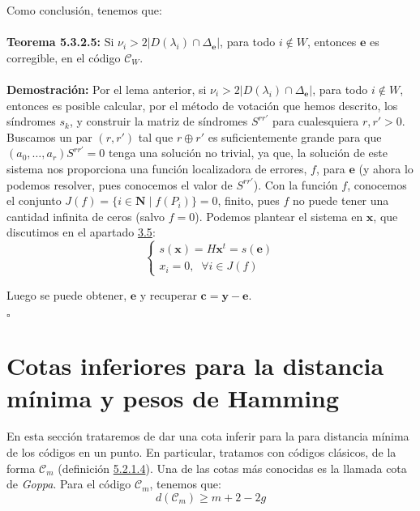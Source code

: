\documentclass[11pt,spanish]{book}
\newcommand{\qed}{\begin{flushright} $\square$ \end{flushright}}
\begin{document}
Como conclusión, tenemos que:\\
\\ \textbf{Teorema 5.3.2.5: } Si $\nu_i > 2|D(\lambda_i) \cap \Delta_{\mathbf{e}}|$, para todo $i\notin W$, entonces $\mathbf{e}$ es corregible, en el código $\mathcal{C}_W$.\\
\\ \textbf{Demostración:}
Por el lema anterior, si $\nu_i > 2|D(\lambda_i) \cap \Delta_{\mathbf{e}}|$, para todo $i\notin W$, entonces es posible calcular, por el método de votación que hemos descrito, los síndromes $s_k$, y construir la matriz de síndromes $S^{rr'}$ para cualesquiera $r,r'>0$. Buscamos un par $(r,r')$ tal que $r\oplus r'$ es suficientemente grande para que $(a_0,\ldots,a_r)S^{rr'}=0$ tenga una solución no trivial, ya que, la solución de este sistema nos proporciona una función localizadora de errores, $f$, para $\mathbf{e}$ (y ahora lo podemos resolver, pues conocemos el valor de $S^{rr'}$). Con la función $f$, conocemos el conjunto $J(f)=\{i\in\mathbf{N}\;|\; f(P_i)\}=0$, finito, pues $f$ no puede tener una cantidad infinita de ceros (salvo $f=0$). Podemos plantear el sistema en $\mathbf{x}$, que discutimos en el apartado \hyperlink{sistemalinealcodigos}{3.5}:
\begin{equation}
    \begin{cases}
    s(\mathbf{x})=H\mathbf{x}^{t}=s(\mathbf{e})\\
    x_i=0,\; \;\forall i\in J(f)
    \end{cases}
\end{equation}

Luego se puede obtener, $\mathbf{e}$ y recuperar $\mathbf{c}=\mathbf{y}-\mathbf{e}$.
\qed
\newpage
\section{Cotas inferiores para la distancia mínima y pesos de Hamming}
En esta sección trataremos de dar una cota inferir para la para distancia mínima de los códigos en un punto. En particular, tratamos con códigos clásicos, de la forma $\mathcal{C}_m$ (definición \hyperlink{def5.3.1.7}{5.2.1.4}). Una de las cotas más conocidas es la llamada cota de \textit{Goppa}. Para el código $\mathcal{C}_m$, tenemos que:
$$d(\mathcal{C}_m)\geq m+2-2g$$
\end{document}
